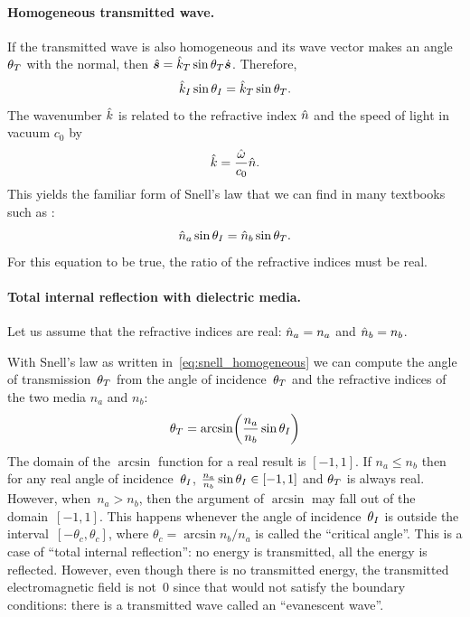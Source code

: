 \paragraph{Homogeneous transmitted wave.}
If the transmitted wave is also homogeneous and its wave vector makes an angle $\theta_T$ with the normal, then $\hat{\bm{s}} = \hat{k}_T \sin \theta_T \dot{\bm{s}}$.
Therefore,
\begin{equation}
    \hat{k}_I \sin \theta_I = \hat{k}_T \sin \theta_T
    \text{.}
\end{equation}
The wavenumber $\hat{k}$ is related
to the refractive index $\hat{n}$
and the speed of light in vacuum $c_0$ by
\begin{equation}
    \hat{k} = \frac{\hat{\omega}}{c_0} \hat{n}
    \text{.}
\end{equation}
This yields the familiar form of Snell's law that we can find in many textbooks such as \textcite{hecht2002optics}:
\begin{equation}
    \hat{n}_a \sin \theta_I = \hat{n}_b \sin \theta_T
    \text{.}
    \label{eq:snell_homogeneous}
\end{equation}
For this equation to be true, the ratio of the refractive indices must be real.

\paragraph{Total internal reflection with dielectric media.}
Let us assume that the refractive indices are real: $\hat{n}_a = n_a$ and $\hat{n}_b = n_b$.

With Snell's law as written in~\cref{eq:snell_homogeneous} we can compute the angle of transmission~$\theta_T$ from the angle of incidence~$\theta_T$ and the refractive indices of the two media $n_a$ and $n_b$:
\begin{equation}
    \theta_\T = \arcsin
    \left(
        \frac{n_a}{n_b} \sin \theta_\I
    \right)
\end{equation}
The domain of the $\arcsin$ function for a real result is $[-1, 1]$.
If $n_a \leq n_b$ then for any real angle of incidence~$\theta_I$, $\frac{n_a}{n_b} \sin \theta_I \in [-1, 1]$ and $\theta_T$ is always real.
However, when~$n_a > n_b$, then the argument of $\arcsin$ may fall out of the domain~$[-1,1]$.
This happens whenever the angle of incidence~$\theta_I$ is outside the interval~$[-\theta_c, \theta_c]$, where $\theta_c = \arcsin{n_b / n_a}$ is called the ``critical angle''.
This is a case of ``total internal reflection'': no energy is transmitted, all the energy is reflected.
However, even though there is no transmitted energy, the transmitted electromagnetic field is not~0 since that would not satisfy the boundary conditions:
there is a transmitted wave called an ``evanescent wave''.

